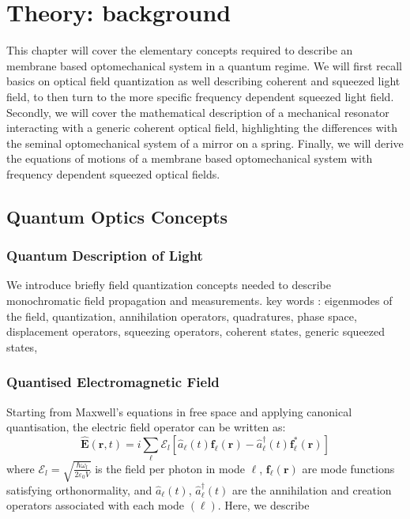 
\chapter{ Theory: background} \label{chap:theory}
This chapter will cover the elementary concepts required to describe an membrane based optomechanical system in a quantum regime. We will first recall basics on optical field quantization as well describing coherent and squeezed light field, to then turn to the more specific frequency dependent squeezed light field. Secondly, we will cover the mathematical description of a mechanical resonator interacting with a generic coherent optical field, highlighting the differences with the seminal optomechanical system of a mirror on a spring. Finally, we will derive the equations of motions of a membrane based optomechanical system with frequency dependent squeezed optical fields. 

\section{Quantum Optics Concepts}
\subsection{Quantum Description of Light}
We introduce briefly field quantization concepts needed to describe monochromatic field propagation and measurements.
key words : eigenmodes of the field, quantization, annihilation operators, quadratures, phase space, displacement operators, squeezing operators, coherent states, generic squeezed states,


\subsection*{Quantised Electromagnetic Field}

Starting from Maxwell's equations in free space and applying canonical quantisation, the electric field operator can be written as:
\begin{equation}
\hat{\mathbf{E}}(\mathbf{r}, t) = i \sum_{ \ell} \mathcal{E}_l \left[ \hat{a}_{\ell}(t) \mathbf{f}_{\ell}(\mathbf{r}) - \hat{a}_{\ell}^\dagger(t) \mathbf{f}_{\ell}^*(\mathbf{r}) \right]
\end{equation}
where $\mathcal{E}_l = \sqrt{\frac{\hbar \omega_l}{2 \varepsilon_0 V}}$ is the field per photon in mode $\ell$, $\mathbf{f}_{\ell}(\mathbf{r})$ are mode functions satisfying orthonormality, and $\hat{a}_{\ell}(t)$, $\hat{a}_{\ell}^\dagger(t)$ are the annihilation and creation operators associated with each mode $(\ell)$. Here, we describe 

